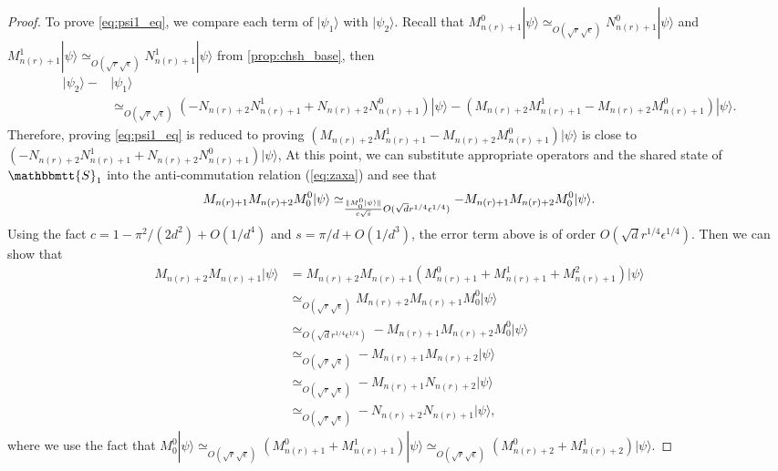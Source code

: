 \documentclass[11pt,letterpaper]{article}
\newcommand{\ket}[1]{|#1\rangle}
\DeclarePairedDelimiter{\norm}{\lVert}{\rVert}
\newcommand{\1}{\mathbb{1}}
\newcommand{\nr}{n(r)}
\newcommand{\bS}{\mathbbmtt{S}}
\newcommand{\se}{\sqrt{\epsilon}}
\newcommand{\qe}{\epsilon^{1/4}}
\newcommand{\sd}{\sqrt{d}}
\newcommand{\sr}{\sqrt{r}}
\newcommand{\qr}{r^{1/4}}
\newcommand{\appd}[1]{\simeq_{#1}}
\theoremstyle{definition}
\begin{document}
\begin{proof}
	To prove \cref{eq:psi1_eq}, we compare each term of $\ket{\psi_1}$
	with $\ket{\psi_2}$.
	Recall that $M_{\nr+1}^0 \ket{\psi} \appd{O(\sr \se)} N_{\nr+1}^0 \ket{\psi}$ 
	and $M_{\nr+1}^1 \ket{\psi} \appd{O(\sr \se)} N_{\nr+1}^1 \ket{\psi}$ from \cref{prop:chsh_base},
	then 
	\begin{align*}
	    \ket{\psi_2} - &\ket{\psi_1} \\
	    &\appd{O(\sr \se)}
	    (- N_{\nr+2}N_{\nr+1}^1+N_{\nr+2}N_{\nr+1}^0)\ket{\psi}
	    - (M_{\nr+2}M_{\nr+1}^1 - M_{\nr+2}M_{\nr+1}^0) \ket{\psi}.
	\end{align*}
	Therefore, proving \cref{eq:psi1_eq} 
	is reduced to proving
	$(M_{\nr+2}M_{\nr+1}^1 - M_{\nr+2}M_{\nr+1}^0) \ket{\psi}$ is close to $(- N_{\nr+2}N_{\nr+1}^1+N_{\nr+2}N_{\nr+1}^0)\ket{\psi}$,
	At this point, we can 
	substitute appropriate operators and the shared 
	state of $\bS_1$ into 
	the anti-commutation relation (\cref{eq:zaxa})
	and see that 
	\begin{align*}
		M_{\nr+1}M_{\nr+2} M_0^0 \ket{\psi} \appd{\frac{\norm{M_0^0\ket{\psi}}}{c\sqrt{s}}O(\sd\qr\qe)} -M_{\nr+1}M_{\nr+2} M_0^0 \ket{\psi}.
	\end{align*}
	Using the fact $c = 1 - \pi^2/(2d^2) + O(1/d^4)$ and $s = \pi/d + O(1/d^3)$, the error term above is of order $O(\sd \qr \qe)$.
	Then we can show that 
	\begin{align*}
		M_{\nr+2}M_{\nr+1}\ket{\psi} &= M_{\nr+2}M_{\nr+1}(M_{\nr+1}^0 + M_{\nr+1}^1+M_{\nr+1}^2)\ket{\psi} \\
			&\appd{O(\sr\se)} M_{\nr+2}M_{\nr+1} M_0^0 \ket{\psi} \\
			&\appd{O(\sd \qr \qe)} -M_{\nr+1}M_{\nr+2} M_0^0 \ket{\psi}\\
			&\appd{O(\sr \se)} -M_{\nr+1}M_{\nr+2} \ket{\psi} \\
			&\appd{O(\sr \se)} -M_{\nr+1} N_{\nr+2} \ket{\psi} \\
			&\appd{O(\sr \se)} -N_{\nr+2} N_{\nr+1} \ket{\psi},
	\end{align*}
	where we use the fact that $M_0^0 \ket{\psi} \appd{O(\sr \se)} (M_{\nr+1}^0+M_{\nr+1}^1)\ket{\psi} \appd{O(\sr \se)}
	(M_{\nr+2}^0+M_{\nr+2}^1) \ket{\psi}$.


\end{proof}
\end{document}
